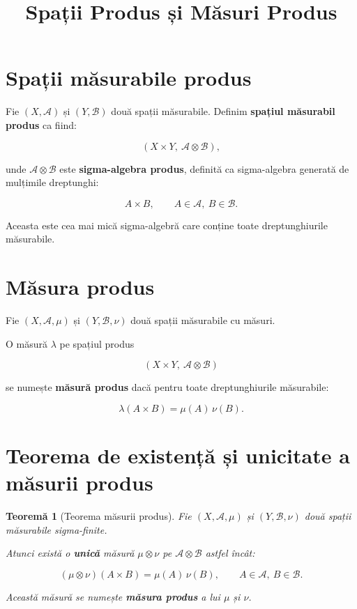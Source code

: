 \documentclass[12pt]{article}
\title{Spații Produs și Măsuri Produs}
\author{}
\date{}
\theoremstyle{plain}
\newtheorem{theorem}{Teoremă}
\begin{document}
\maketitle

\section{Spații măsurabile produs}

Fie $(X, \mathcal{A})$ și $(Y, \mathcal{B})$ două spații măsurabile.
Definim \textbf{spațiul măsurabil produs} ca fiind:



\[
(X \times Y, \ \mathcal{A} \otimes \mathcal{B}),
\]



unde $\mathcal{A} \otimes \mathcal{B}$ este \textbf{sigma-algebra produs},
definită ca sigma-algebra generată de mulțimile dreptunghi:



\[
A \times B, \qquad A \in \mathcal{A}, \ B \in \mathcal{B}.
\]



Aceasta este cea mai mică sigma-algebră care conține toate dreptunghiurile
măsurabile.

\section{Măsura produs}

Fie $(X, \mathcal{A}, \mu)$ și $(Y, \mathcal{B}, \nu)$ două spații măsurabile
cu măsuri.

O măsură $\lambda$ pe spațiul produs


\[
(X \times Y, \ \mathcal{A} \otimes \mathcal{B})
\]


se numește \textbf{măsură produs} dacă pentru toate dreptunghiurile măsurabile:



\[
\lambda(A \times B) = \mu(A)\,\nu(B).
\]



\section{Teorema de existență și unicitate a măsurii produs}

\begin{theorem}[Teorema măsurii produs]
Fie $(X, \mathcal{A}, \mu)$ și $(Y, \mathcal{B}, \nu)$ două spații măsurabile
sigma-finite.

Atunci există o \textbf{unică} măsură $\mu \otimes \nu$ pe
$\mathcal{A} \otimes \mathcal{B}$ astfel încât:



\[
(\mu \otimes \nu)(A \times B) = \mu(A)\,\nu(B),
\qquad A \in \mathcal{A}, \ B \in \mathcal{B}.
\]



Această măsură se numește \textbf{măsura produs} a lui $\mu$ și $\nu$.
\end{theorem}
\end{document}
